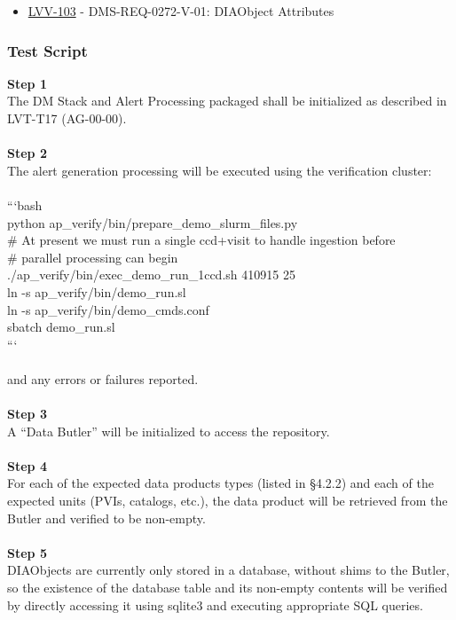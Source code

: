 \begin{itemize}
\tightlist
\item
  \href{https://jira.lsstcorp.org/browse/LVV-103}{LVV-103} -
  DMS-REQ-0272-V-01: DIAObject Attributes
\end{itemize}

\hypertarget{test-script-29}{%
\subsubsection{Test Script}\label{test-script-29}}

\textbf{Step 1}\\
The DM Stack and Alert Processing packaged shall be initialized as
described in LVT-T17 (AG-00-00).\\
~\\
\textbf{Step 2}\\
The alert generation processing will be executed using the verification
cluster:\\
~\\
```bash\\
python ap\_verify/bin/prepare\_demo\_slurm\_files.py\\
\# At present we must run a single ccd+visit to handle ingestion
before\\
\# parallel processing can begin\\
./ap\_verify/bin/exec\_demo\_run\_1ccd.sh 410915 25\\
ln -s ap\_verify/bin/demo\_run.sl\\
ln -s ap\_verify/bin/demo\_cmds.conf\\
sbatch demo\_run.sl\\
```\\
~\\
and any errors or failures reported.\\
~\\
\textbf{Step 3}\\
A ``Data Butler'' will be initialized to access the repository.\\
~\\
\textbf{Step 4}\\
For each of the expected data products types (listed in §4.2.2) and each
of the expected units (PVIs, catalogs, etc.), the data product will be
retrieved from the Butler and verified to be non-empty.\\
~\\
\textbf{Step 5}\\
DIAObjects are currently only stored in a database, without shims to the
Butler, so the existence of the database table and its non-empty
contents will be verified by directly accessing it using sqlite3 and
executing appropriate SQL queries.\\
~\\

